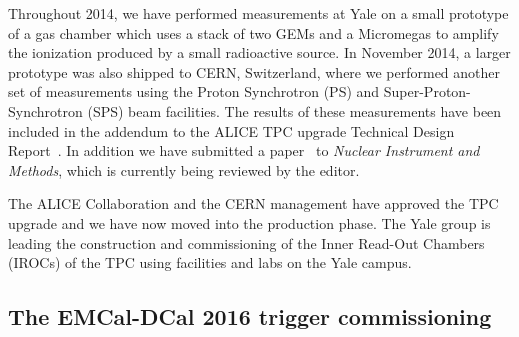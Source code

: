 \documentclass[12pt, a4paper, twoside, titlepage]{article}
\begin{document}
Throughout 2014, we have performed measurements at Yale on a small prototype of a gas chamber which uses a stack of two GEMs and a Micromegas to amplify the ionization
produced by a small radioactive source. In November 2014, a larger prototype was also shipped to CERN, Switzerland, where we performed another set of measurements using
the Proton Synchrotron (PS) and Super-Proton-Synchrotron (SPS) beam facilities.
The results of these measurements have been included in the addendum to the ALICE TPC upgrade Technical Design Report~\cite{}.
In addition we have submitted a paper~\cite{} to \emph{Nuclear Instrument and Methods}, which is currently being reviewed by the editor.

The ALICE Collaboration and the CERN management have approved the TPC upgrade and we have now moved into the production phase.
The Yale group is leading the construction and commissioning of the Inner Read-Out Chambers (IROCs) of the TPC using facilities and labs on the Yale campus.

\subsection{The EMCal-DCal 2016 trigger commissioning}
\label{sect:TriggerCommisioning}

{}

\end{document}

